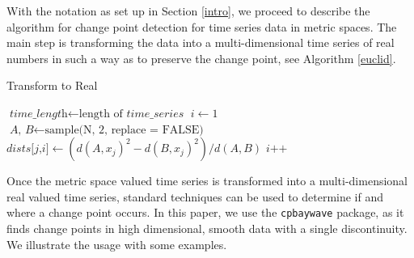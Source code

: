 \documentclass[smallextended]{svjour3}       %
\begin{document}
With the notation as set up in Section \ref{intro}, we proceed to
describe the algorithm for change point detection for time series data
in metric spaces. The main step is transforming the data into a
multi-dimensional time series of real numbers in such a way as to
preserve the change point, see Algorithm \ref{euclid}.

\begin{algorithm}\label{algo:1}
\caption{Transform to Real}\label{euclid}
\begin{algorithmic}[1]
\State $\textit{time\_length} \gets \text{length of }\textit{time\_series}$
\State $i \gets 1$
\State $\textit{A, B} \gets \text{sample(N, 2, replace = FALSE)}$
\State $\textit{dists[j,i]} \gets (d(A, x_j)^2 - d(B, x_j)^2)/d(A, B)$
\EndFor
\State $\textit{i++}$
\EndWhile
\EndProcedure
\end{algorithmic}
\end{algorithm}

Once the metric space valued time series is transformed into a
multi-dimensional real valued time series, standard techniques can be
used to determine if and where a change point occurs. In this paper, we
use the \texttt{cpbaywave} package, as it finds change points in high
dimensional, smooth data with a single discontinuity. We illustrate the
usage with some examples.
\end{document}

